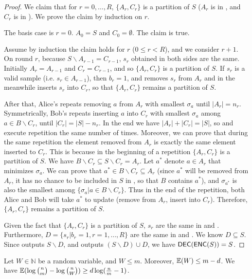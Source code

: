 \begin{proof}
  We claim that for $r=0,\ldots, R$, $\{A_r, C_r\}$ is a partition of $S$ ($A_r$ is in \enc, and $C_r$ is in \dec). We prove the claim by induction on $r$.
  
  The basis case is $r=0$. $A_0=S$ and $C_0=\emptyset$. The claim is true.
  
  Assume by induction the claim holds for $r$ ($0\le r < R$), and we consider $r+1$. 
  On round $r$, because $S\backslash A_{r-1}=C_{r-1}$, $s_r$ obtained in both sides are the same. 
  Initially $A_r=A_{r-1}$ and $C_r=C_{r-1}$, and so $\{A_r,C_r\}$ is a partition of $S$. 
  If $s_r$ is a valid sample (i.e. $s_r\in A_{r-1}$), then $b_r=1$, and \enc removes $s_r$ from $A_r$ and in the meanwhile \dec inserts $s_r$ into $C_r$, so that $\{A_r, C_r\}$ remains a partition of $S$. 
  
  After that, Alice's \enc repeats removing $a$ from $A_r$ with smallest $\sigma_a$ until $|A_r|=n_r$. 
  Symmetrically, Bob's \dec repeats inserting $a$ into $C_r$ with smallest $\sigma_a$ among $a\in B\backslash C_r$, until $|C_r|=|S|-n_r$. 
  In the end we have $|A_r|+|C_r|=|S|$, so \enc and \dec execute repetition the same number of times. 
  Moreover, we can prove that during the same repetition the element removed from $A_r$ is exactly the same element inserted to $C_r$. 
  This is because in the beginning of a repetition $\{A_r, C_r\}$ is a partition of $S$. 
  We have $B\backslash C_r\subseteq S\backslash C_r=A_r$. Let $a^*$ denote  $a\in A_r$ that minimizes $\sigma_a$. 
  We can prove that $a^*\in B\backslash C_r\subseteq A_r$ (since $a^*$ will be removed from $A_r$, it has no chance to be included in $S$ in \enc, so that $B$ contains $a^*$), and $\sigma_{a^*}$ is also the smallest among $\{\sigma_a|a\in B\backslash C_r\}$. 
  Thus in the end of the repetition, both Alice and Bob will take $a^{*}$ to update (remove from $A_r$, insert into $C_r$). 
  Therefore, $\{A_r, C_r\}$ remains a partition of $S$.
  
  Given the fact that $\{A_r, C_r\}$ is a partition of $S$, $s_r$ are the same in \enc and \dec. 
  Furthermore, $D=\{s_r|b_r=1,r=1,\ldots, R\}$ are the same in \enc and \dec.
  We know $D\subseteq S$. 
  Since \enc outputs $S\backslash D$, and \dec outputs $(S\backslash D)\cup D$, we have $\textsf{DEC}(\textsf{ENC}(S))=S$. 
\end{proof}

\begin{lemma} \label{lemma:bits-saving}
  Let $W\in \mathbb{N}$ be a random variable, and $W\le m$. 
  Moreover, $\operatorname*{\mathbb{E}}(W)\le m-d$. 
  We have $\operatorname*{\mathbb{E}}(\log {n \choose m}-\log {n \choose W})\ge d \log (\frac{n}{m}-1)$.
\end{lemma}

